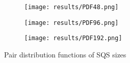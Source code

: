\begin{figure}[H]
\begin{subfigure}{\textwidth}
\texttt{[image: results/PDF48.png]}
\end{subfigure}
\begin{subfigure}{\textwidth}
\texttt{[image: results/PDF96.png]}
\end{subfigure}
\begin{subfigure}{\textwidth}
\texttt{[image: results/PDF192.png]}
\end{subfigure}
\caption{Pair distribution functions of SQS sizes}
\end{figure}

